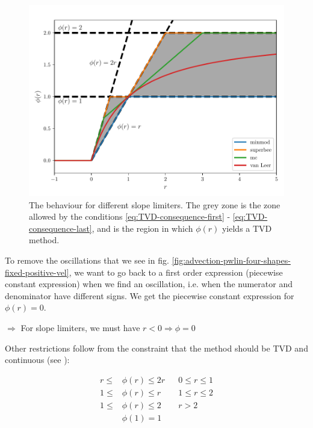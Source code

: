 \begin{figure}[H]
	\centering
	\includegraphics[width=.9\textwidth]{./figures/limiters.pdf}%
	\caption{
		\label{fig:limiters-r-phi}
		The behaviour for different slope limiters. 
		The grey zone is the zone allowed by the conditions \ref{eq:TVD-consequence-first}  - \ref{eq:TVD-consequence-last}, and is the region in which $\phi(r)$ yields a TVD method.
	}
\end{figure}





To remove the oscillations that we see in fig. \ref{fig:advection-pwlin-four-shapes-fixed-positive-vel}, we want to go back to a first order expression (piecewise constant expression) when we find an oscillation, i.e. when the numerator and denominator have different signs.
We get the piecewise constant expression for $\phi(r) = 0$.

$\Rightarrow$ For slope limiters, we must have $r < 0 \Rightarrow \phi = 0$


Other restrictions follow from the constraint that the method should be TVD and continuous (see \cite{swebyHighResolutionSchemes1984}):

\begin{align}
	r \le& \phi(r) \le 2r 	&&	 0  \le r \le 1 \label{eq:TVD-consequence-first}\\
	1 \le& \phi(r) \le r 	&&	 1 \le r \le 2 \\
	1 \le& \phi(r) \le 2 	&&	 r > 2 \\
	& \phi(1) = 1 &&  \label{eq:TVD-consequence-last}
\end{align}



